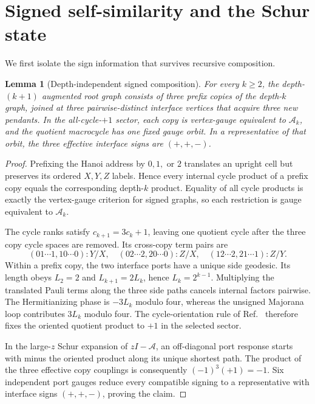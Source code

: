 \documentclass[11pt]{article}
\newtheorem{lemma}[theorem]{Lemma}
\theoremstyle{remark}
\newcommand{\Acal}{\mathcal{A}}
\begin{document}
\section{Signed self-similarity and the Schur state}
\label{sec:schur}

We first isolate the sign information that survives recursive composition.

\begin{lemma}[Depth-independent signed composition]
\label{lem:sign}
For every $k\geq2$, the depth-$(k+1)$ augmented root graph consists of three
prefix copies of the depth-$k$ graph, joined at three pairwise-distinct
interface vertices that acquire three new pendants.  In the all-cycle-$+1$
sector, each copy is vertex-gauge equivalent to $\Acal_k$, and the quotient
macrocycle has one fixed gauge orbit.  In a representative of that orbit, the
three effective interface signs are $(+,+,-)$.
\end{lemma}

\begin{proof}
Prefixing the Hanoi address by $0,1,$ or $2$ translates an upright cell but
preserves its ordered $X,Y,Z$ labels.  Hence every internal cycle product of a
prefix copy equals the corresponding depth-$k$ product.  Equality of all cycle
products is exactly the vertex-gauge criterion for signed graphs, so each
restriction is gauge equivalent to $\Acal_k$.

The cycle ranks satisfy $c_{k+1}=3c_k+1$, leaving one quotient cycle after the
three copy cycle spaces are removed.  Its cross-copy term pairs are
\begin{equation}
 (01\cdots1,10\cdots0):Y/X,\quad
 (02\cdots2,20\cdots0):Z/X,\quad
 (12\cdots2,21\cdots1):Z/Y.
 \label{eq:cross-copy}
\end{equation}
Within a prefix copy, the two interface ports have a unique side geodesic.
Its length obeys $L_2=2$ and $L_{k+1}=2L_k$, hence
$L_k=2^{k-1}$.  Multiplying the translated Pauli terms along the three side
paths cancels internal factors pairwise.  The Hermitianizing phase is
$-3L_k$ modulo four, whereas the unsigned Majorana loop contributes $3L_k$
modulo four.  The cycle-orientation rule of Ref.~\cite{ChapmanFlammia2020}
therefore fixes the oriented quotient product to $+1$ in the selected sector.

In the large-$z$ Schur expansion of $zI-\Acal$, an off-diagonal port response
starts with minus the oriented product along its unique shortest path.  The
product of the three effective copy couplings is consequently
$(-1)^3(+1)=-1$.  Six independent port gauges reduce every compatible signing
to a representative with interface signs $(+,+,-)$, proving the claim.
\end{proof}
\end{document}
